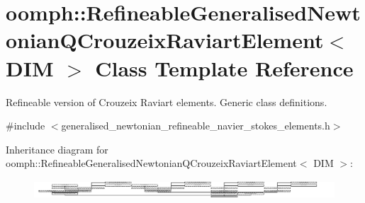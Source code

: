 \hypertarget{classoomph_1_1RefineableGeneralisedNewtonianQCrouzeixRaviartElement}{}\section{oomph\+:\+:Refineable\+Generalised\+Newtonian\+Q\+Crouzeix\+Raviart\+Element$<$ D\+IM $>$ Class Template Reference}
\label{classoomph_1_1RefineableGeneralisedNewtonianQCrouzeixRaviartElement}


Refineable version of Crouzeix Raviart elements. Generic class definitions.  




{\ttfamily \#include $<$generalised\+\_\+newtonian\+\_\+refineable\+\_\+navier\+\_\+stokes\+\_\+elements.\+h$>$}

Inheritance diagram for oomph\+:\+:Refineable\+Generalised\+Newtonian\+Q\+Crouzeix\+Raviart\+Element$<$ D\+IM $>$\+:\begin{figure}[H]
\begin{center}
\leavevmode
\includegraphics[height=0.692641cm]{classoomph_1_1RefineableGeneralisedNewtonianQCrouzeixRaviartElement}
\end{center}
\end{figure}
